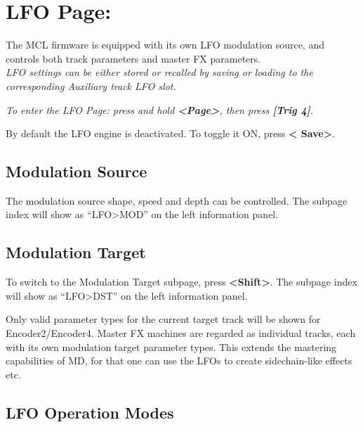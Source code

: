 \chapter{LFO Page:}
The MCL firmware is equipped with its own LFO modulation source, and controls both track parameters and master FX parameters.\\\textit{LFO settings can be either stored or recalled by saving or loading to the corresponding Auxiliary track LFO slot.}

\textit{To enter the LFO Page: press and hold \textbf{<Page>}, then press \textbf{[Trig 4]}.}

By default the LFO engine is deactivated. To toggle it ON, press \textbf{< Save>}.


\section{Modulation Source}

The modulation source shape, speed and depth can be controlled. The subpage index will show as ``LFO>MOD'' on the left information panel.


\newpage


\section{Modulation Target}
To switch to the Modulation Target subpage, press \textbf{<Shift>}. The subpage index will show as ``LFO>DST'' on the left information panel.


Only valid parameter types for the current target track will be shown for Encoder2/Encoder4. Master FX machines are regarded as individual tracks, each with its own modulation target parameter types. This extends the mastering capabilities of MD, for that one can use the LFOs to create sidechain-like effects etc.


\section{LFO Operation Modes}

